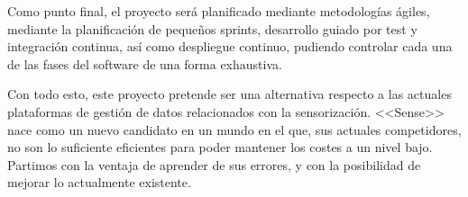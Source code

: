 Como punto final, el proyecto será planificado mediante metodologías ágiles,
mediante la planificación de pequeños sprints, desarrollo guiado por
test y integración continua, así como despliegue continuo, pudiendo controlar
cada una de las fases del software de una forma exhaustiva.

Con todo esto, este proyecto pretende ser una alternativa respecto a las actuales plataformas de
gestión de datos relacionados con la sensorización. <<Sense>>  nace como un nuevo
candidato en un mundo en el que, sus actuales competidores, no son lo suficiente
eficientes para poder mantener los costes a un nivel bajo. Partimos con la
ventaja de aprender de sus errores, y con la posibilidad de mejorar lo
actualmente existente.














